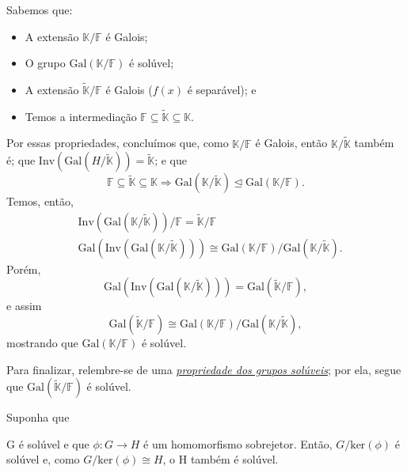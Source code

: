 \documentclass[../algebraIII_notes.tex]{subfiles}
\begin{document}
\begin{proof*}[Teorema]
	Sabemos que:
	\begin{itemize}
		\item A extensão \(\mathbb{K}/\mathbb{F}\) é Galois;
		\item O grupo \(\mathrm{Gal}(\mathbb{K}/\mathbb{F})\) é solúvel;
		\item A extensão \(\tilde{\mathbb{K}}/\mathbb{F}\) é Galois (\(f(x)\) é separável); e
		\item Temos a intermediação \(\mathbb{F}\subseteq \tilde{\mathbb{K}}\subseteq \mathbb{K}\).
	\end{itemize}
	Por essas propriedades, concluímos que, como \(\mathbb{K}/\mathbb{F}\) é Galois, então \(\mathbb{K}/\tilde{\mathbb{K}}\) também é; que \(\mathrm{Inv}(\mathrm{Gal}(H/\tilde{\mathbb{K}}))=\tilde{\mathbb{K}}\); e que
	\[
		\mathbb{F}\subseteq \tilde{\mathbb{K}}\subseteq \mathbb{K} \Rightarrow \mathrm{Gal}(\mathbb{K}/\tilde{\mathbb{K}})\trianglelefteq \mathrm{Gal}(\mathbb{K}/\mathbb{F}).
	\]
	Temos, então,
	\begin{align*}
		 & \mathrm{Inv}(\mathrm{Gal}(\mathbb{K}/\tilde{\mathbb{K}}))/\mathbb{F} = \tilde{\mathbb{K}}/\mathbb{F}                                                          \\
		 & \mathrm{Gal}(\mathrm{Inv}(\mathrm{Gal}(\mathbb{K}/\tilde{\mathbb{K}})))\cong \mathrm{Gal}(\mathbb{K}/\mathbb{F})/\mathrm{Gal}(\mathbb{K}/\tilde{\mathbb{K}}).
	\end{align*}
	Porém,
	\[
		\mathrm{Gal}(\mathrm{Inv}(\mathrm{Gal}(\mathbb{K}/\tilde{\mathbb{K}})))=\mathrm{Gal}(\tilde{\mathbb{K}}/\mathbb{F}),
	\]
	e assim
	\[
		\mathrm{Gal}(\tilde{\mathbb{K}}/\mathbb{F})\cong \mathrm{Gal}(\mathbb{K}/\mathbb{F})/\mathrm{Gal}(\mathbb{K}/\tilde{\mathbb{K}}),
	\]
	mostrando que \(\mathrm{Gal}(\mathbb{K}/\mathbb{F})\) é solúvel.

	Para finalizar, relembre-se de uma \hyperlink{soluble.group.properties}{\textit{propriedade dos grupos solúveis}}; por ela, segue que \(\mathrm{Gal}(\tilde{\mathbb{K}}/\mathbb{F})\) é solúvel. \qedsymbol

\end{proof*}
\begin{tcolorbox}[
		skin=enhanced,
		title=Lembrete!,
		after title={\hfill Solubilidade do Quociente},
		fonttitle=\bfseries,
		sharp corners=downhill,
		colframe=black,
		colbacktitle=yellow!75!white,
		colback=yellow!30,
		colbacklower=black,
		coltitle=black,
		drop large lifted shadow
	]
	\hypertarget{soluble.group.properties}{Suponha que} G é solúvel e que \(\phi:G\rightarrow H\) é um homomorfismo sobrejetor. Então, \(G/\mathrm{ker}(\phi )\) é solúvel e, como \(G/\mathrm{ker}(\phi )\cong H\), o H também é solúvel.
\end{tcolorbox}
\end{document}

